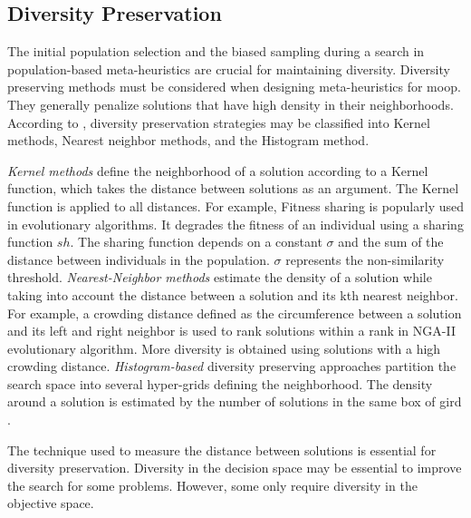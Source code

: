 \subsection{Diversity Preservation}
The initial population selection and the biased sampling during a search in population-based meta-heuristics are crucial for maintaining diversity. Diversity preserving methods must be considered when designing meta-heuristics for \gls{moop}. They generally penalize solutions that have high density in their neighborhoods. According to \parencite{Emmerich2018AMethods}, diversity preservation strategies may be classified into Kernel methods, Nearest neighbor methods, and the Histogram method.

\textit{Kernel methods} define the neighborhood of a solution according to a Kernel function, which takes the distance between solutions as an argument. The Kernel function is applied to all distances. For example, Fitness sharing is popularly used in evolutionary algorithms. It degrades the fitness of an individual using a sharing function $sh$. The sharing function depends on a constant $\sigma$ and the sum of the distance between individuals in the population.  $\sigma$ represents the non-similarity threshold.  \textit{Nearest-Neighbor methods} estimate the density of a solution while taking into account the distance between a solution and its kth nearest neighbor. For example, a crowding distance defined as the circumference between a solution and its left and right neighbor is used to rank solutions within a rank in NGA-II evolutionary algorithm. More diversity is obtained using solutions with a high crowding distance. \textit{Histogram-based} diversity preserving approaches partition the search space into several hyper-grids defining the neighborhood. The density around a solution is estimated by the number of solutions in the same box of gird \parencite{Talbi2009Metaheuristics:Implementation}.

The technique used to measure the distance between solutions is essential for diversity preservation. Diversity in the decision space may be essential to improve the search for some problems. However, some only require diversity in the objective space.

